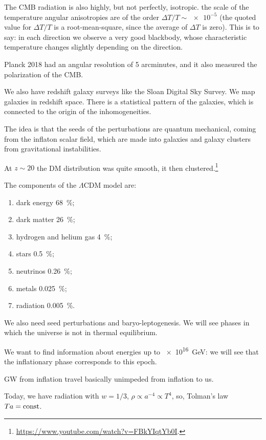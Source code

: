 \documentclass[main.tex]{subfiles}
\begin{document}
The CMB radiation is also highly, but not perfectly, isotropic. the scale of the temperature angular anisotropies are of the order \(\Delta T / T \sim \num{e-5}\) (the quoted value for \(\Delta T/T\) is a root-mean-square, since the average of \(\Delta T\) is zero). 
This is to say: in each direction we observe a very good blackbody, whose characteristic temperature changes slightly depending on the direction.

Planck 2018 had an angular resolution of 5 arcminutes, and it also measured the polarization of the CMB. 

We also have redshift galaxy surveys like the Sloan Digital Sky Survey. We map galaxies in redshift space. 
There is a statistical pattern of the galaxies, which is connected to the origin of the inhomogeneities. 

The idea is that the seeds of the perturbations are quantum mechanical, coming from the inflaton scalar field, which are made into galaxies and galaxy clusters from gravitational instabilities.

At \(z \sim 20\) the DM distribution was quite smooth, it then clustered.\footnote{\url{https://www.youtube.com/watch?v=FBkYIqtYb0I}.}

The components of the \(\Lambda \)CDM model are: 
\begin{enumerate}
    \item dark energy \SI{68}{\percent};
    \item dark matter \SI{26}{\percent};
    \item hydrogen and helium gas \SI{4}{\percent};
    \item stars \SI{.5}{\percent};
    \item neutrinos \SI{.26}{\percent};
    \item metals \SI{.025}{\percent};
    \item radiation \SI{.005}{\percent}.
\end{enumerate}

We also need seed perturbations and baryo-leptogenesis.
We will see phases in which the universe is not in thermal equilibrium.

We want to find information about energies up to \SI{e16}{GeV}: we will see that the inflationary phase corresponds to this epoch.

GW from inflation travel basically unimpeded from inflation to us. 

Today, we have radiation with \(w = 1/3\), \(\rho \propto a^{-4} \propto T^{4} \), so, Tolman's law \(Ta = \text{const}\). 
\end{document}
